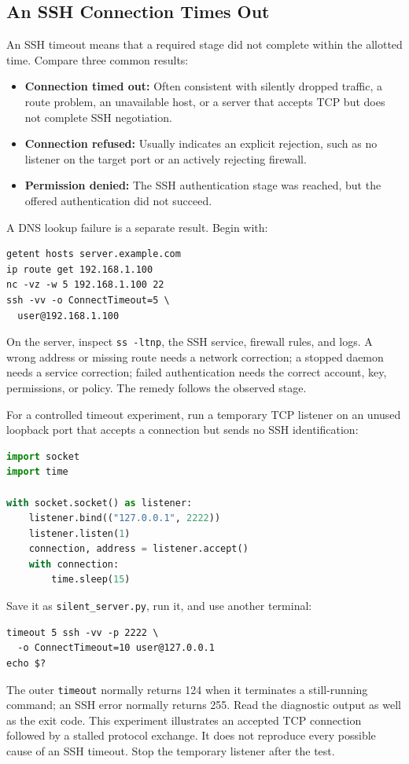 \documentclass[journal]{IEEEtran}
\begin{document}
\subsection{An SSH Connection Times Out}
An SSH timeout means that a required stage did not complete within the allotted time. Compare three common results:
\begin{itemize}
    \item \textbf{Connection timed out:} Often consistent with silently dropped traffic, a route problem, an unavailable host, or a server that accepts TCP but does not complete SSH negotiation.
    \item \textbf{Connection refused:} Usually indicates an explicit rejection, such as no listener on the target port or an actively rejecting firewall.
    \item \textbf{Permission denied:} The SSH authentication stage was reached, but the offered authentication did not succeed.
\end{itemize}
A DNS lookup failure is a separate result. Begin with:
\begin{lstlisting}
getent hosts server.example.com
ip route get 192.168.1.100
nc -vz -w 5 192.168.1.100 22
ssh -vv -o ConnectTimeout=5 \
  user@192.168.1.100
\end{lstlisting}
On the server, inspect \texttt{ss -ltnp}, the SSH service, firewall rules, and logs. A wrong address or missing route needs a network correction; a stopped daemon needs a service correction; failed authentication needs the correct account, key, permissions, or policy. The remedy follows the observed stage.

For a controlled timeout experiment, run a temporary TCP listener on an unused loopback port that accepts a connection but sends no SSH identification:
\begin{lstlisting}[language=Python]
import socket
import time

with socket.socket() as listener:
    listener.bind(("127.0.0.1", 2222))
    listener.listen(1)
    connection, address = listener.accept()
    with connection:
        time.sleep(15)
\end{lstlisting}
Save it as \texttt{silent\_server.py}, run it, and use another terminal:
\begin{lstlisting}
timeout 5 ssh -vv -p 2222 \
  -o ConnectTimeout=10 user@127.0.0.1
echo $?
\end{lstlisting}
The outer \texttt{timeout} normally returns 124 when it terminates a still-running command; an SSH error normally returns 255. Read the diagnostic output as well as the exit code. This experiment illustrates an accepted TCP connection followed by a stalled protocol exchange. It does not reproduce every possible cause of an SSH timeout. Stop the temporary listener after the test.
\end{document}
